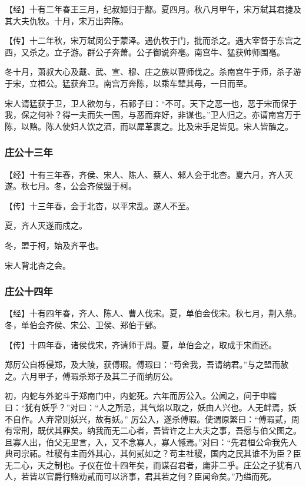 \documentclass[]{article}
\begin{document}
【经】十有二年春王三月，纪叔姬归于酅。夏四月。秋八月甲午，宋万弑其君捷及其大夫仇牧。十月，宋万出奔陈。

【传】十二年秋，宋万弑闵公于蒙泽。遇仇牧于门，批而杀之。遇大宰督于东宫之西，又杀之。立子游。群公子奔萧。公子御说奔亳。南宫牛、猛获帅师围亳。

冬十月，萧叔大心及戴、武、宣、穆、庄之族以曹师伐之。杀南宫牛于师，杀子游于宋，立桓公。猛获奔卫。南宫万奔陈，以乘车辇其母，一日而至。

宋人请猛获于卫，卫人欲勿与，石祁子曰：``不可。天下之恶一也，恶于宋而保于我，保之何补？得一夫而失一国，与恶而弃好，非谋也。''卫人归之。亦请南宫万于陈，以赂。陈人使妇人饮之酒，而以犀革裹之。比及宋手足皆见。宋人皆醢之。

\hypertarget{header-n448}{%
\subsubsection{庄公十三年}\label{header-n448}}

【经】十有三年春，齐侯、宋人、陈人、蔡人、邾人会于北杏。夏六月，齐人灭遂。秋七月。冬，公会齐侯盟于柯。

【传】十三年春，会于北杏，以平宋乱。遂人不至。

夏，齐人灭遂而戍之。

冬，盟于柯，始及齐平也。

宋人背北杏之会。

\hypertarget{header-n456}{%
\subsubsection{庄公十四年}\label{header-n456}}

【经】十有四年春，齐人、陈人、曹人伐宋。夏，单伯会伐宋。秋七月，荆入蔡。冬，单伯会齐侯、宋公、卫侯、郑伯于鄄。

【传】十四年春，诸侯伐宋，齐请师于周。夏，单伯会之，取成于宋而还。

郑厉公自栎侵郑，及大陵，获傅瑕。傅瑕曰：``苟舍我，吾请纳君。''与之盟而赦之。六月甲子，傅瑕杀郑子及其二子而纳厉公。

初，内蛇与外蛇斗于郑南门中，内蛇死。六年而厉公入。公闻之，问于申繻曰：``犹有妖乎？''对曰：``人之所忌，其气焰以取之，妖由人兴也。人无衅焉，妖不自作。人弃常则妖兴，故有妖。''
厉公入，遂杀傅瑕。使谓原繁曰：``傅瑕贰，周有常刑，既伏其罪矣。纳我而无二心者，吾皆许之上大夫之事，吾愿与伯父图之。且寡人出，伯父无里言，入，又不念寡人，寡人憾焉。''对曰：``先君桓公命我先人典司宗祏。社稷有主而外其心，其何贰如之？苟主社稷，国内之民其谁不为臣？臣无二心，天之制也。子仪在位十四年矣，而谋召君者，庸非二乎。庄公之子犹有八人，若皆以官爵行赂劝贰而可以济事，君其若之何？臣闻命矣。''乃缢而死。
\end{document}
